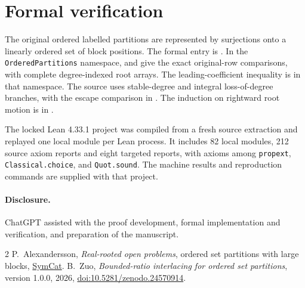 \documentclass[10pt]{article}
\begin{document}
\section{Formal verification}
The original ordered labelled partitions are represented by surjections onto a linearly ordered set of block positions. The formal entry is . In the \texttt{OrderedPartitions} namespace,  and  give the exact original-row comparisons, with complete degree-indexed root arrays. The leading-coefficient inequality is  in that namespace. The source uses stable-degree and integral loss-of-degree branches, with the escape comparison in . The induction on rightward root motion is in .

The locked Lean 4.33.1 project was compiled from a fresh source extraction and replayed one local module per Lean process. It includes 82 local modules, 212 source axiom reports and eight targeted reports, with axioms among \texttt{propext}, \texttt{Classical.choice}, and \texttt{Quot.sound}. The machine results and reproduction commands are supplied with that project.

\paragraph{Disclosure.}
ChatGPT assisted with the proof development, formal implementation and verification, and preparation of the manuscript.

\begin{thebibliography}{2}
 P.~Alexandersson, \emph{Real-rooted open problems}, ordered set partitions with large blocks, \href{https://www.symmetricfunctions.com/realRootedOpenProblems.htm\#set-partitions-and-trees}{SymCat}.
 B.~Zuo, \emph{Bounded-ratio interlacing for ordered set partitions}, version 1.0.0, 2026, \href{https://doi.org/10.5281/zenodo.24570914}{doi:10.5281/zenodo.24570914}.
\end{thebibliography}
\end{document}

